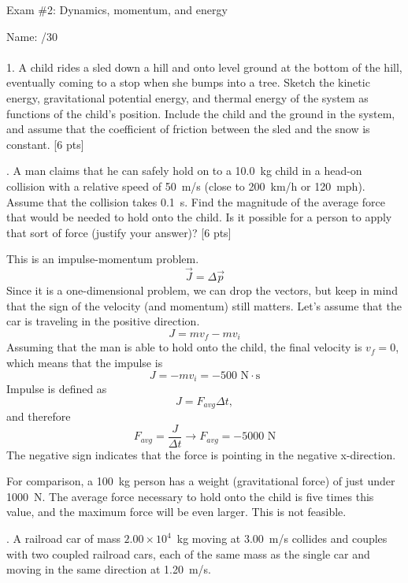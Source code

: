\documentclass[11pt,letterpaper]{article}
\newcommand{\sol}[1]{{\color{White} #1}} %
\begin{document}
\setlength{\parindent}{0cm}
\setlength{\parskip}{11pt}
Exam \#2: Dynamics, momentum, and energy

Name: \hfill /30\\

\hrulefill\\
1. A child rides a sled down a hill and onto level ground at the bottom of the hill, eventually coming
to a stop when she bumps into a tree. Sketch the kinetic energy, gravitational potential energy, and thermal energy of the system as functions of the child's position. Include the child and the ground in the system, and assume that the coefficient of friction between the sled and the snow is constant. [6 pts]




. A man claims that he can safely hold on to a 10.0~kg child in a head-on collision with a relative speed of 50~m/s (close to 200~km/h or 120~mph). Assume that the collision takes 0.1~s. Find the magnitude of the average force that would be needed to hold onto the child. Is it possible for a person to apply that sort of force (justify your answer)? [6 pts]

\sol{This is an impulse-momentum problem.
$$\vec{J} = \Delta \vec{p}$$
Since it is a one-dimensional problem, we can drop the vectors, but keep in mind that the sign of the velocity (and momentum) still matters. Let's assume that the car is traveling in the positive direction.
$$J = mv_f - mv_i$$
Assuming that the man is able to hold onto the child, the final velocity is $v_f=0$, which means that the impulse is
$$J = -mv_i = -500\mbox{ N}\cdot\mbox{s}$$
Impulse is defined as
$$J=F_{avg}\Delta t,$$
and therefore
$$F_{avg}=\frac{J}{\Delta t} \rightarrow \boxed{F_{avg} = -5000\mbox{ N}}$$
The negative sign indicates that the force is pointing in the negative x-direction.

For comparison, a 100~kg person has a weight (gravitational force) of just under 1000~N. The average force necessary to hold onto the child is five times this value, and the maximum force will be even larger. This is not feasible.

} 






. A railroad car of mass $2.00\times 10^4$~kg moving at 3.00~m/s collides and couples with two coupled railroad cars, each of the same mass as the single car and moving in the same direction at 1.20~m/s. 
\end{document}
